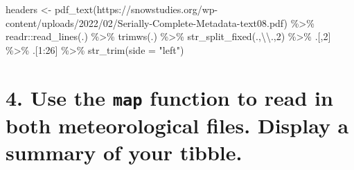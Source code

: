 \documentclass[
]{book}
\newenvironment{Shaded}{\begin{snugshade}}{\end{snugshade}}
\newcommand{\AttributeTok}[1]{\textcolor[rgb]{0.77,0.63,0.00}{#1}}
\newcommand{\DecValTok}[1]{\textcolor[rgb]{0.00,0.00,0.81}{#1}}
\newcommand{\FunctionTok}[1]{\textcolor[rgb]{0.00,0.00,0.00}{#1}}
\newcommand{\NormalTok}[1]{#1}
\newcommand{\OtherTok}[1]{\textcolor[rgb]{0.56,0.35,0.01}{#1}}
\newcommand{\SpecialCharTok}[1]{\textcolor[rgb]{0.00,0.00,0.00}{#1}}
\newcommand{\StringTok}[1]{\textcolor[rgb]{0.31,0.60,0.02}{#1}}
\begin{document}
\begin{Shaded}
\begin{Highlighting}[]
\NormalTok{headers }\OtherTok{\textless{}{-}} \FunctionTok{pdf\_text}\NormalTok{(}\StringTok{\textquotesingle{}https://snowstudies.org/wp{-}content/uploads/2022/02/Serially{-}Complete{-}Metadata{-}text08.pdf\textquotesingle{}}\NormalTok{) }\SpecialCharTok{\%\textgreater{}\%}
\NormalTok{  readr}\SpecialCharTok{::}\FunctionTok{read\_lines}\NormalTok{(.) }\SpecialCharTok{\%\textgreater{}\%}
  \FunctionTok{trimws}\NormalTok{(.) }\SpecialCharTok{\%\textgreater{}\%}
  \FunctionTok{str\_split\_fixed}\NormalTok{(.,}\StringTok{\textquotesingle{}}\SpecialCharTok{\textbackslash{}\textbackslash{}}\StringTok{.\textquotesingle{}}\NormalTok{,}\DecValTok{2}\NormalTok{) }\SpecialCharTok{\%\textgreater{}\%}
\NormalTok{  .[,}\DecValTok{2}\NormalTok{] }\SpecialCharTok{\%\textgreater{}\%}
\NormalTok{  .[}\DecValTok{1}\SpecialCharTok{:}\DecValTok{26}\NormalTok{] }\SpecialCharTok{\%\textgreater{}\%}
  \FunctionTok{str\_trim}\NormalTok{(}\AttributeTok{side =} \StringTok{"left"}\NormalTok{)}
\end{Highlighting}
\end{Shaded}

\hypertarget{use-the-map-function-to-read-in-both-meteorological-files.-display-a-summary-of-your-tibble.}{%
\section{\texorpdfstring{4. Use the \texttt{map} function to read in both meteorological files. Display a summary of your tibble.}{4. Use the map function to read in both meteorological files. Display a summary of your tibble.}}\label{use-the-map-function-to-read-in-both-meteorological-files.-display-a-summary-of-your-tibble.}}
\end{document}
